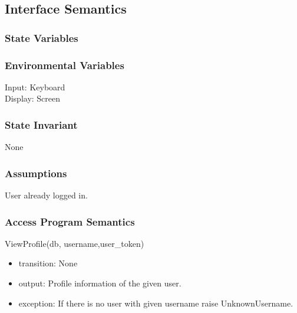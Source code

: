 \documentclass[12pt, titlepage]{article}
\begin{document}
\subsection{Interface Semantics}
\subsubsection{State Variables}

\subsubsection{Environmental Variables}
Input: Keyboard\\
Display: Screen


\subsubsection{State Invariant}
None

\subsubsection{Assumptions}
User already logged in.

\subsubsection{Access Program Semantics}
ViewProfile(db, username,user\_token)
\begin{itemize}
    \item transition: None
    \item output: Profile information of the given user.
    \item exception: If there is no user with given username raise UnknownUsername.
\end{itemize}
\end{document}
